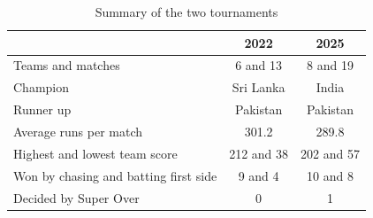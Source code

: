\begin{table}[!t]
\caption{Summary of the two tournaments}
\label{tab:summary}
\centering
\footnotesize
\begin{tabular}{@{}lcc@{}}
\toprule
 & \textbf{2022} & \textbf{2025} \\
\midrule
Teams and matches & 6 and 13 & 8 and 19 \\
Champion & Sri Lanka & India \\
Runner up & Pakistan & Pakistan \\
Average runs per match & 301.2 & 289.8 \\
Highest and lowest team score & 212 and 38 & 202 and 57 \\
Won by chasing and batting first side & 9 and 4 & 10 and 8 \\
Decided by Super Over & 0 & 1 \\
\bottomrule
\end{tabular}
\end{table}
